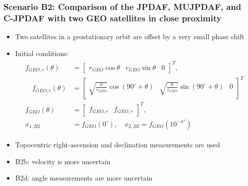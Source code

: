 \documentclass[hyperref={pdftex,pdfpagemode=none,pdfstartview=FitH},10pt]{beamer}
\begin{document}
\begin{frame}
\frametitle{Scenario B2: Comparison of the JPDAF, MUJPDAF, and C-JPDAF with two GEO satellites in close proximity}


\begin{itemize}
\item Two satellites in a geostationary orbit are offset by a very small phase shift
\item Initial conditions:
\begin{align}
\begin{split}
f_{GEO,r}(\theta)&=\begin{bmatrix}r_{GEO}\cos\theta & r_{GEO}\sin\theta & 0\end{bmatrix}^T,
\\
\quad f_{GEO,\dot r}(\theta)&=\begin{bmatrix}\sqrt{\frac{\mu}{r_{GEO}}}\cos(90^\circ+\theta) & \sqrt{\frac{\mu}{r_{GEO}}}\sin(90^\circ+\theta) & 0\end{bmatrix}^T
\\
f_{GEO}(\theta)&=\begin{bmatrix}f_{GEO,r} & f_{GEO,\dot r}\end{bmatrix}^T,
\\
x_{1,B2}&=f_{GEO}(0^\circ), \quad x_{2,B2}=f_{GEO}({10^{-4}}^\circ)
\end{split}\nonumber
\end{align}
\item Topocentric right-ascension and declination measurements are used
\item B2b: velocity is more uncertain
\item B2d: angle measurements are more uncertain
\end{itemize}


\end{frame}
\end{document}
